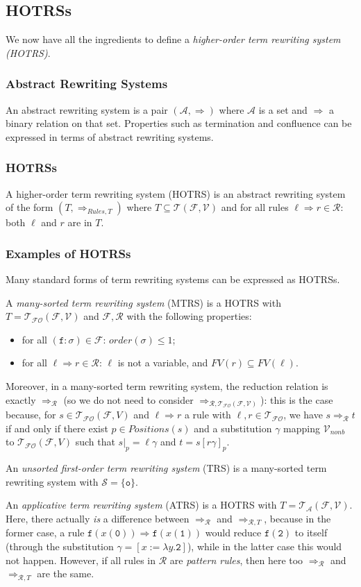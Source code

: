 \documentclass{lmcs}
\theoremstyle{theorem}\newtheorem{theorem}{Theorem}
\theoremstyle{theorem}\newtheorem{lemma}[theorem]{Lemma}
\theoremstyle{theorem}\newtheorem{corollary}[theorem]{Corollary}
\theoremstyle{definition}\newtheorem{definition}[theorem]{Definition}
\theoremstyle{definition}\newtheorem{example}[theorem]{Example}
\newcommand{\F}{\mathcal{F}}
\newcommand{\V}{\mathcal{V}}
\newcommand{\Vfree}{\mathcal{V}_{\mathit{nonb}}}
\newcommand{\Sorts}{\mathcal{S}}
\newcommand{\Terms}{\mathcal{T}}
\newcommand{\ATerms}{\mathcal{T}_{\mathcal{A}}}
\newcommand{\FOTerms}{\mathcal{T}_{\mathcal{FO}}}
\newcommand{\Rules}{\mathcal{R}}
\newcommand{\FV}{\mathit{FV}}
\newcommand{\Positions}{\mathit{Positions}}
\newcommand{\order}{\mathit{order}}
\newcommand{\atype}{\sigma}
\newcommand{\identifier}[1]{\mathtt{#1}}
\newcommand{\afun}{\identifier{f}}
\newcommand{\avar}{x}
\newcommand{\bvar}{y}
\newcommand{\abs}[2]{\lambda #1.#2}
\newcommand{\arrz}{\Rightarrow}
\newcommand{\arr}[1]{\arrz_{#1}}
\newcommand{\symb}[1]{\mathtt{#1}}
\newcommand{\nul}{\symb{0}}
\newcommand{\unitsort}{\mathtt{o}}
\newcommand{\mysubsection}[1]{\vspace{-12pt}\subsubsection{#1}}
\begin{document}
\subsection{HOTRSs}

We now have all the ingredients to define a \emph{higher-order term rewriting system (HOTRS)}.

\mysubsection{Abstract Rewriting Systems}

An abstract rewriting system is a pair $(\mathcal{A},\arrz)$ where $\mathcal{A}$ is a set and
$\arrz$ a binary relation on that set.  Properties such as termination and confluence can be
expressed in terms of abstract rewriting systems.

\mysubsection{HOTRSs}

A higher-order term rewriting system (HOTRS) is an abstract rewriting system of the form
$(T,\arr{Rules,T})$ where $T \subseteq \Terms(\F,\V)$ and for all rules $\ell \arrz r \in \Rules$:
both $\ell$ and $r$ are in $T$.

\mysubsection{Examples of HOTRSs}
Many standard forms of term rewriting systems can be expressed as HOTRSs.

A \emph{many-sorted term rewriting system} (MTRS) is a HOTRS with $T = \FOTerms(\F,\V)$ and
$\F,\Rules$ with the following properties:
\begin{itemize}
\item for all $(\afun : \atype) \in \F$: $\order(\atype) \leq 1$;
\item for all $\ell \arrz r \in \Rules$: $\ell$ is not a variable, and $\FV(r) \subseteq \FV(\ell)$.
\end{itemize}
Moreover, in a many-sorted term rewriting system, the reduction relation is exactly $\arr{\Rules}$
(so we do not need to consider $\arr{\Rules,\FOTerms(\F,\V)}$): this is the case because, for
$s \in \FOTerms(\F,V)$ and $\ell \arrz r$ a rule with $\ell,r \in \FOTerms$, we have
$s \arr{\Rules} t$ if and only if there exist $p \in \Positions(s)$ and a substitution $\gamma$
mapping $\Vfree$ to $\FOTerms(\F,V)$ such that $s|_p = \ell\gamma$ and $t = s[r\gamma]_p$.

An \emph{unsorted first-order term rewriting system} (TRS) is a many-sorted term rewriting system
with $\Sorts = \{ \unitsort \}$.

An \emph{applicative term rewriting system} (ATRS) is a HOTRS with $T = \ATerms(\F,\V)$.  Here,
there actually \emph{is} a difference between $\arr{\Rules}$ and $\arr{\Rules,T}$, because in the
former case, a rule $\afun(\avar(\nul)) \arrz \afun(\avar(\symb{1}))$ would reduce
$\afun(\symb{2})$ to itself (through the substitution $\gamma = [\avar:=\abs{\bvar}{\symb{2}}]$),
while in the latter case this would not happen.  However, if all rules in $\Rules$ are
\emph{pattern rules}, then here too $\arr{\Rules}$ and $\arr{\Rules,T}$ are the same.
\end{document}
